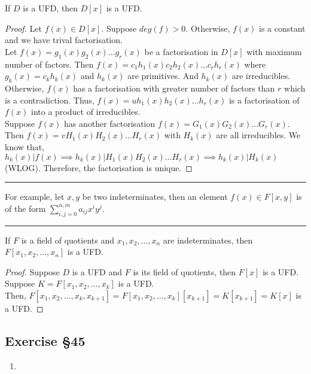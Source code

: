\begin{theorem}
	If $D$ is a UFD, then $D[x]$ is a UFD.
\end{theorem}
\begin{proof}
	Let $f(x) \in D[x]$.
	Suppose $deg(f) > 0$.
	Otherwise, $f(x)$ is a constant and we have trival factorisation.\\
	
	Let $f(x) = g_1(x)g_2(x)\dots g_r(x)$ be a factorisation in $D[x]$ with maximum number of factors.	
	Then $f(x) = c_1h_1(x)c_2h_2(x)\dots c_rh_r(x)$ where $g_k(x) = c_kh_k(x)$ and $h_k(x)$ are primitives.
	And $h_k(x)$ are irreducibles.
	Otherwise, $f(x)$ has a factorisation with greater number of factors than $r$ which is a contradiction.
	Thus, $f(x) = uh_1(x)h_2(x)\dots h_r(x)$ is a factorisation of $f(x)$ into a product of irreducibles.\\

	Suppose $f(x)$ has another factorisation $f(x) = G_1(x)G_2(x)\dots G_r(x)$.
	Then $f(x) = vH_1(x)H_2(x)\dots H_r(x)$ with $H_k(x)$ are all irreducibles.
	We know that, $h_k(x) | f(x) \implies h_k(x) | H_1(x)H_2(x)\dots H_r(x) \implies h_k(x) | H_k(x)$ (WLOG).
	Therefore, the factorisation is unique.
\end{proof}
\hrule\vspace{1em}
For example, let $x,y$ be two indeterminates, then an element $f(x) \in F[x,y]$ is of the form $\displaystyle\sum_{i,j = 0}^{n,m} a_{ij}x^i y^j$.
\hrule\vspace{1em}
\begin{corollary}
	If $F$ is a field of quotients and $x_1,x_2,\dots,x_n$ are indeterminates, then $F[x_1,x_2,\dots,x_n]$ is a UFD.
\end{corollary}
\begin{proof}
	Suppose $D$ is a UFD and $F$ is its field of quotients, then $F[x]$ is a UFD.\\

	Suppose $K = F[x_1,x_2,\dots,x_k]$ is a UFD.\\

	Then, $F[x_1,x_2,\dots,x_k,x_{k+1}] = F[x_1,x_2,\dots, x_k][x_{k+1}] = K[x_{k+1}] = K[x]$ is a UFD.
\end{proof}

\subsection{Exercise \S45}
\begin{enumerate}
	\item
\end{enumerate}

